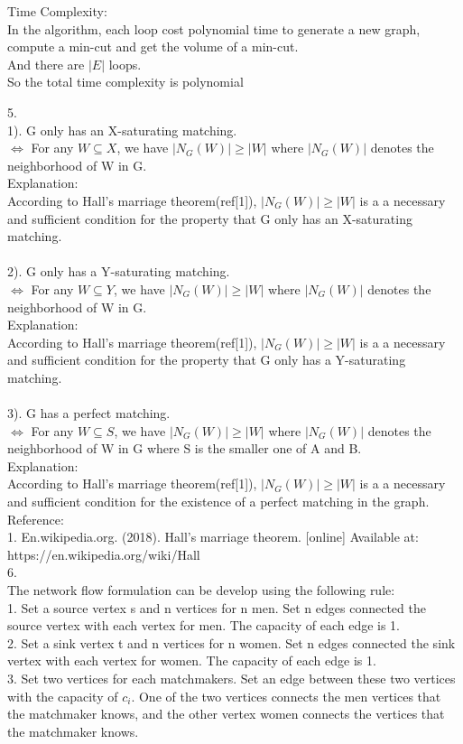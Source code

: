 \documentclass[a4paper]{article}
\begin{document}
Time Complexity:\\
In the algorithm, each loop cost polynomial time to generate a new graph, compute a min-cut and get the volume of a min-cut.\\
And there are $|E|$ loops.\\
So the total time complexity is polynomial\;

5.\\
1). G only has an X-saturating matching. \\
$\Leftrightarrow$
For any $W \subseteq X$, we have $|N_G(W)| \geqslant |W|$ where $|N_G(W)|$ denotes the neighborhood of W in G. \\
Explanation:\\
According to Hall's marriage theorem(ref[1]), $|N_G(W)| \geqslant |W|$ is a a necessary and sufficient condition for the property that G only has an X-saturating matching.\\
\\
2). G only has a Y-saturating matching.\\
$\Leftrightarrow$
For any $W \subseteq Y$, we have $|N_G(W)| \geqslant |W|$ where $|N_G(W)|$ denotes the neighborhood of W in G. \\
Explanation:\\
According to Hall's marriage theorem(ref[1]), $|N_G(W)| \geqslant |W|$ is a a necessary and sufficient condition for the property that G only has a Y-saturating matching.\\
\\
3). G has a perfect matching.\\
$\Leftrightarrow$
For any $W \subseteq S$, we have $|N_G(W)| \geqslant |W|$ where $|N_G(W)|$ denotes the neighborhood of W in G where S is the smaller one of A and B. \\
Explanation:\\
According to Hall's marriage theorem(ref[1]), $|N_G(W)| \geqslant |W|$ is a a necessary and sufficient condition for the existence of a perfect matching in the graph.\\

Reference:\\
1. En.wikipedia.org. (2018). Hall's marriage theorem. [online] Available at: https://en.wikipedia.org/wiki/Hall%
\\

6.\\
The network flow formulation can be develop using the following rule:\\
1. Set a source vertex s and n vertices for n men. Set n edges connected the source vertex with each vertex for men. The capacity of each edge is 1.\\
2. Set a sink vertex t and n vertices for n women. Set n edges connected the sink vertex with each vertex for women. The capacity of each edge is 1.\\
3. Set two vertices for each matchmakers. Set an edge between these two vertices with the capacity of $c_i$.
One of the two vertices connects the men vertices that the matchmaker knows, and the other vertex women connects the vertices that the matchmaker knows.\\
\end{document}
